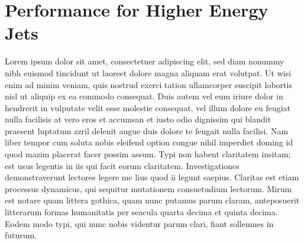 \documentclass[final,3p,times,twocolumn]{elsarticle}
\begin{document}



\section{Performance for Higher Energy Jets}
Lorem ipsum dolor sit amet, consectetuer adipiscing elit, sed diam nonummy nibh euismod tincidunt ut laoreet dolore magna aliquam erat volutpat. Ut wisi enim ad minim veniam, quis
nostrud exerci tation ullamcorper suscipit lobortis nisl ut aliquip ex ea commodo consequat. Duis autem vel eum iriure dolor in hendrerit in vulputate velit esse molestie consequat,
vel illum dolore eu feugiat nulla facilisis at vero eros et accumsan et iusto odio dignissim qui blandit praesent luptatum zzril delenit augue duis dolore te feugait nulla facilisi.
Nam liber tempor cum soluta nobis eleifend option congue nihil imperdiet doming id quod mazim placerat facer possim assum. Typi non habent claritatem insitam; est usus legentis in
iis qui facit eorum claritatem. Investigationes demonstraverunt lectores legere me lius quod ii legunt saepius. Claritas est etiam processus dynamicus, qui sequitur mutationem
consuetudium lectorum. Mirum est notare quam littera gothica, quam nunc putamus parum claram, anteposuerit litterarum formas humanitatis per seacula quarta decima et quinta
decima. Eodem modo typi, qui nunc nobis videntur parum clari, fiant sollemnes in futurum.
\end{document}
